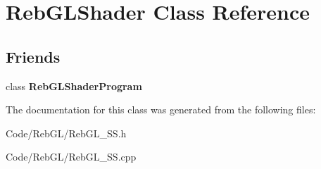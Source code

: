 \hypertarget{class_reb_g_l_shader}{}\section{Reb\+G\+L\+Shader Class Reference}
\label{class_reb_g_l_shader}
\subsection*{Friends}
\begin{DoxyCompactItemize}
\item 
class {\bfseries Reb\+G\+L\+Shader\+Program}\hypertarget{class_reb_g_l_shader_aec770bda9d5d724c88468605858dba88}{}\label{class_reb_g_l_shader_aec770bda9d5d724c88468605858dba88}

\end{DoxyCompactItemize}


The documentation for this class was generated from the following files\+:\begin{DoxyCompactItemize}
\item 
Code/\+Reb\+G\+L/Reb\+G\+L\+\_\+\+S\+S.\+h\item 
Code/\+Reb\+G\+L/Reb\+G\+L\+\_\+\+S\+S.\+cpp\end{DoxyCompactItemize}
